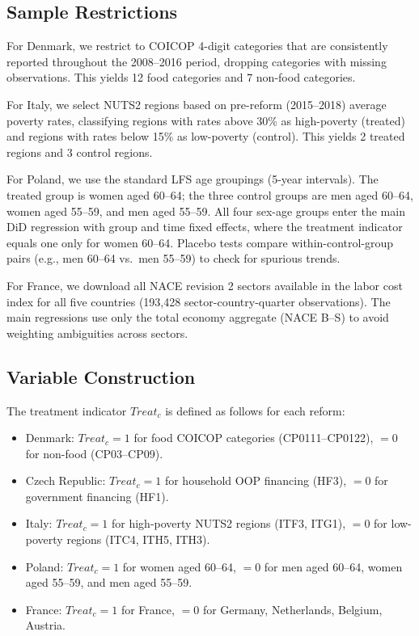 \documentclass[12pt]{article}
\begin{document}
\subsection{Sample Restrictions}

For Denmark, we restrict to COICOP 4-digit categories that are consistently reported throughout the 2008--2016 period, dropping categories with missing observations. This yields 12 food categories and 7 non-food categories.

For Italy, we select NUTS2 regions based on pre-reform (2015--2018) average poverty rates, classifying regions with rates above 30\% as high-poverty (treated) and regions with rates below 15\% as low-poverty (control). This yields 2 treated regions and 3 control regions.

For Poland, we use the standard LFS age groupings (5-year intervals). The treated group is women aged 60--64; the three control groups are men aged 60--64, women aged 55--59, and men aged 55--59. All four sex-age groups enter the main DiD regression with group and time fixed effects, where the treatment indicator equals one only for women 60--64. Placebo tests compare within-control-group pairs (e.g., men 60--64 vs.\ men 55--59) to check for spurious trends.

For France, we download all NACE revision 2 sectors available in the labor cost index for all five countries (193,428 sector-country-quarter observations). The main regressions use only the total economy aggregate (NACE B--S) to avoid weighting ambiguities across sectors.

\subsection{Variable Construction}

The treatment indicator $Treat_c$ is defined as follows for each reform:

\begin{itemize}
    \item Denmark: $Treat_c = 1$ for food COICOP categories (CP0111--CP0122), $= 0$ for non-food (CP03--CP09).
    \item Czech Republic: $Treat_c = 1$ for household OOP financing (HF3), $= 0$ for government financing (HF1).
    \item Italy: $Treat_c = 1$ for high-poverty NUTS2 regions (ITF3, ITG1), $= 0$ for low-poverty regions (ITC4, ITH5, ITH3).
    \item Poland: $Treat_c = 1$ for women aged 60--64, $= 0$ for men aged 60--64, women aged 55--59, and men aged 55--59.
    \item France: $Treat_c = 1$ for France, $= 0$ for Germany, Netherlands, Belgium, Austria.
\end{itemize}
\end{document}
